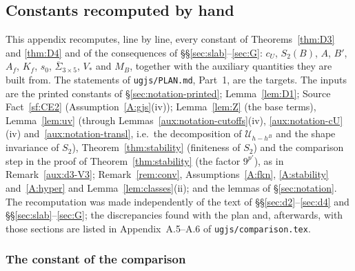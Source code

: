 \documentclass[11pt,a4paper]{article}
\theoremstyle{plain}
\theoremstyle{definition}
\theoremstyle{plain}
\theoremstyle{definition}
\newcommand{\Uc}{\mathcal U}
\begin{document}
\subsection{Constants recomputed by hand}\label{app:D-constants}

This appendix recomputes, line by line, every constant of Theorems~\ref{thm:D3} and
\ref{thm:D4} and of the consequences of \S\S\ref{sec:slab}--\ref{sec:G}: $c_U$, $S_2(B)$, $A$, $B'$, $A_f$,
$K_f$, $s_0$, $\overline\Sigma_{3\times5}$, $V_*$ and $M_B$, together with the auxiliary quantities they
are built from.  The statements of \texttt{ugjs/PLAN.md}, Part~1, are the targets.  The inputs
are the printed constants of \S\ref{sec:notation-printed}; Lemma~\ref{lem:D1}; Source Fact~\ref{sf:CE2} (Assumption~\ref{A:gjs}(iv)); Lemma~\ref{lem:Z} (the base terms), Lemma~\ref{lem:uv} (through
Lemmas~\ref{aux:notation-cutoffs}(iv), \ref{aux:notation-cU}(iv) and~\ref{aux:notation-transl},
i.e.\ the decomposition of $\Uc_{h-h^B}$ and the shape invariance of $S_2$), Theorem~\ref{thm:stability} (finiteness
of $S_2$) and the comparison step in the proof of Theorem~\ref{thm:stability} (the factor $9^{p'}$), as in
Remark~\ref{aux:d3-V3}; Remark~\ref{rem:conv}, Assumptions~\ref{A:fkn}, \ref{A:stability} and~\ref{A:hyper} and Lemma~\ref{lem:classes}(ii); and the lemmas of \S\ref{sec:notation}.  The recomputation was made independently of the text of
\S\S\ref{sec:d2}--\ref{sec:d4} and \S\S\ref{sec:slab}--\ref{sec:G}; the discrepancies found with the plan and,
afterwards, with those sections are listed in Appendix~A.5--A.6 of \texttt{ugjs/comparison.tex}.

\subsubsection*{The constant of the comparison}
\end{document}
